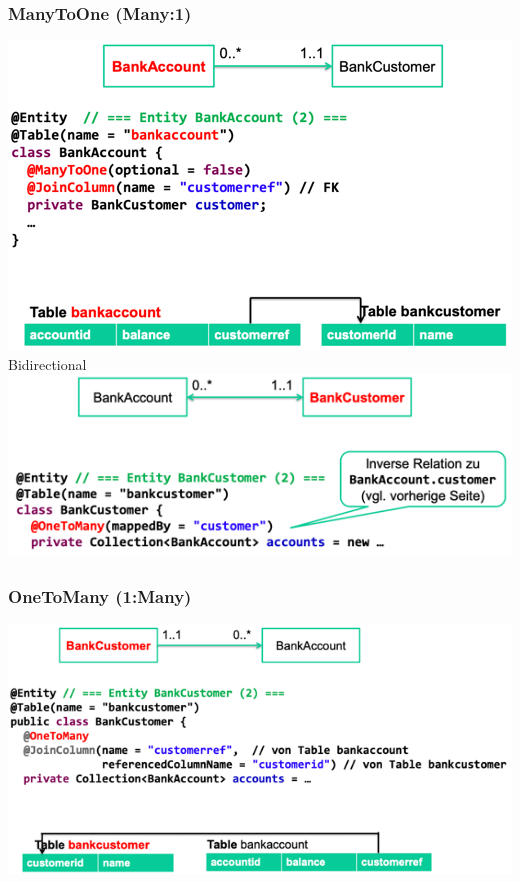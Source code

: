 \documentclass[a4paper, landscape, 8pt]{scrartcl}
\begin{document}
\begin{multicols*}{4}
        \subsubsection{ManyToOne (Many:1)}
        \includegraphics[width=\columnwidth]{graphic/05-many-to-one}
        Bidirectional\\
        \includegraphics[width=\columnwidth]{graphic/06-bidirectional-many-to-one}

        \subsubsection{OneToMany (1:Many)}
        \includegraphics[width=\columnwidth]{graphic/07-one-to-many}


\end{multicols*}
\end{document}
